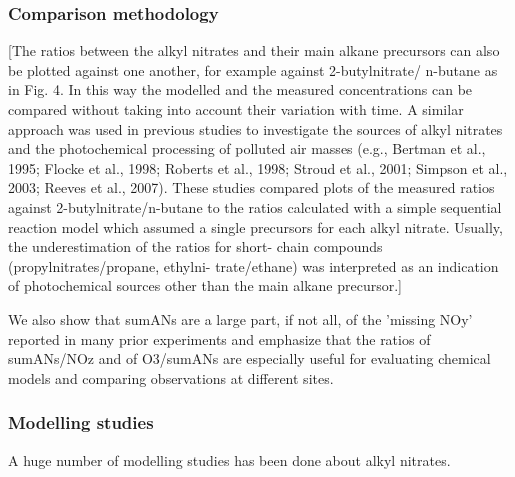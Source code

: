 \documentclass[11pt,a4paper]{article}
\begin{document}
\subsubsection{Comparison methodology}
\citep{Sommariva2008}
[The ratios between the alkyl nitrates and their
main alkane precursors can also be plotted against one another, for example against 2-butylnitrate/ n-butane as in Fig. 4. In this way the modelled and the measured concentrations can be compared without taking into account their variation with time. A similar approach was used in previous studies to investigate the sources of alkyl nitrates and the photochemical processing of polluted air masses (e.g., Bertman et al., 1995; Flocke et al., 1998; Roberts et al., 1998; Stroud et al., 2001; Simpson et al., 2003; Reeves et al., 2007). These studies compared plots of the measured ratios against 2-butylnitrate/n-butane to the ratios calculated with a simple sequential reaction model which assumed a single precursors for each alkyl nitrate. Usually, the underestimation of the ratios for short- chain compounds (propylnitrates/propane, ethylni- trate/ethane) was interpreted as an indication of photochemical sources other than the main alkane precursor.]

\citep{Day2003}
We also show that sumANs are a large part, if not all, of the 'missing NOy' reported in many prior experiments and emphasize that the ratios of sumANs/NOz and of O3/sumANs are especially useful for evaluating chemical models and comparing observations at different sites.

\subsubsection{Modelling studies}
A huge number of modelling studies has been done about alkyl nitrates.
\end{document}
